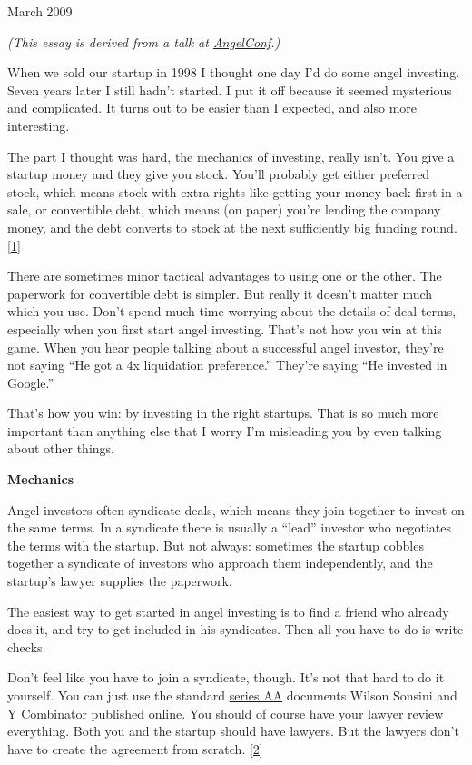 March 2009

\emph{(This essay is derived from a talk at
\href{http://angelconf.org}{AngelConf}.)}

When we sold our startup in 1998 I thought one day I'd do some angel
investing. Seven years later I still hadn't started. I put it off
because it seemed mysterious and complicated. It turns out to be easier
than I expected, and also more interesting.

The part I thought was hard, the mechanics of investing, really isn't.
You give a startup money and they give you stock. You'll probably get
either preferred stock, which means stock with extra rights like getting
your money back first in a sale, or convertible debt, which means (on
paper) you're lending the company money, and the debt converts to stock
at the next sufficiently big funding round. {[}\hyperref[f1n]{1}{]}

There are sometimes minor tactical advantages to using one or the other.
The paperwork for convertible debt is simpler. But really it doesn't
matter much which you use. Don't spend much time worrying about the
details of deal terms, especially when you first start angel investing.
That's not how you win at this game. When you hear people talking about
a successful angel investor, they're not saying ``He got a 4x
liquidation preference.'' They're saying ``He invested in Google.''

That's how you win: by investing in the right startups. That is so much
more important than anything else that I worry I'm misleading you by
even talking about other things.

\textbf{Mechanics}

Angel investors often syndicate deals, which means they join together to
invest on the same terms. In a syndicate there is usually a ``lead''
investor who negotiates the terms with the startup. But not always:
sometimes the startup cobbles together a syndicate of investors who
approach them independently, and the startup's lawyer supplies the
paperwork.

The easiest way to get started in angel investing is to find a friend
who already does it, and try to get included in his syndicates. Then all
you have to do is write checks.

Don't feel like you have to join a syndicate, though. It's not that hard
to do it yourself. You can just use the standard
\href{http://ycombinator.com/seriesaa.html}{series AA} documents Wilson
Sonsini and Y Combinator published online. You should of course have
your lawyer review everything. Both you and the startup should have
lawyers. But the lawyers don't have to create the agreement from
scratch. {[}\hyperref[f2n]{2}{]}

